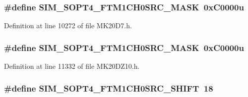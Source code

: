 \subsubsection[{\texorpdfstring{S\+I\+M\+\_\+\+S\+O\+P\+T4\+\_\+\+F\+T\+M1\+C\+H0\+S\+R\+C\+\_\+\+M\+A\+SK}{SIM_SOPT4_FTM1CH0SRC_MASK}}]{\setlength{\rightskip}{0pt plus 5cm}\#define S\+I\+M\+\_\+\+S\+O\+P\+T4\+\_\+\+F\+T\+M1\+C\+H0\+S\+R\+C\+\_\+\+M\+A\+SK~0x\+C0000u}\hypertarget{group___s_i_m___register___masks_ga8be459723f070708becab666dc6abc47}{}\label{group___s_i_m___register___masks_ga8be459723f070708becab666dc6abc47}


Definition at line 10272 of file M\+K20\+D7.\+h.

\subsubsection[{\texorpdfstring{S\+I\+M\+\_\+\+S\+O\+P\+T4\+\_\+\+F\+T\+M1\+C\+H0\+S\+R\+C\+\_\+\+M\+A\+SK}{SIM_SOPT4_FTM1CH0SRC_MASK}}]{\setlength{\rightskip}{0pt plus 5cm}\#define S\+I\+M\+\_\+\+S\+O\+P\+T4\+\_\+\+F\+T\+M1\+C\+H0\+S\+R\+C\+\_\+\+M\+A\+SK~0x\+C0000u}\hypertarget{group___s_i_m___register___masks_ga8be459723f070708becab666dc6abc47}{}\label{group___s_i_m___register___masks_ga8be459723f070708becab666dc6abc47}


Definition at line 11332 of file M\+K20\+D\+Z10.\+h.

\subsubsection[{\texorpdfstring{S\+I\+M\+\_\+\+S\+O\+P\+T4\+\_\+\+F\+T\+M1\+C\+H0\+S\+R\+C\+\_\+\+S\+H\+I\+FT}{SIM_SOPT4_FTM1CH0SRC_SHIFT}}]{\setlength{\rightskip}{0pt plus 5cm}\#define S\+I\+M\+\_\+\+S\+O\+P\+T4\+\_\+\+F\+T\+M1\+C\+H0\+S\+R\+C\+\_\+\+S\+H\+I\+FT~18}\hypertarget{group___s_i_m___register___masks_gaee4e8fb1805bded49220a407c1620345}{}\label{group___s_i_m___register___masks_gaee4e8fb1805bded49220a407c1620345}


